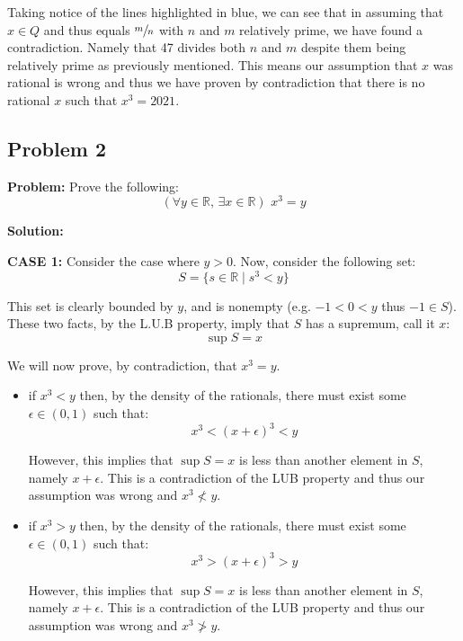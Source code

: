 \documentclass{article}
\newcommand{\R}{\mathbb R}
\begin{document}
Taking notice of the lines highlighted in blue, we can see that in assuming that $x\in Q$ and thus equals $\sfrac{m}{n}$ with $n$ and $m$ relatively prime, we have found a contradiction. Namely that 47 divides both $n$ and $m$ despite them being relatively prime as previously mentioned. This means our assumption that $x$ was rational is wrong and thus we have proven by contradiction that there is no rational $x$ such that $x^3=2021$.

\subsection*{Problem 2}
\noindent\textbf{Problem:} Prove the following:
\begin{equation*}
  (\forall y\in\R,\,\exists x\in\R)\,\,x^3=y
\end{equation*}


\noindent\textbf{Solution:}
\medskip

\textbf{CASE 1:} Consider the case where $y>0$. Now, consider the following set:
\begin{equation*}
  S=\{s\in\R\mid s^3<y\}
\end{equation*}

This set is clearly bounded by $y$, and is nonempty (e.g. $-1<0<y$ thus $-1\in S$). These two facts, by the L.U.B property, imply that $S$ has a supremum, call it $x$:
\begin{equation*}
  \sup S = x
\end{equation*}

We will now prove, by contradiction, that $x^3=y$.
\begin{itemize}
  \item if $x^3<y$ then, by the density of the rationals, there must exist some $\epsilon\in(0,1)$ such that:
  $$x^3<(x+\epsilon)^3<y$$

  However, this implies that $\sup S=x$ is less than another element in $S$, namely $x+\epsilon$. This is a contradiction of the LUB property and thus our assumption was wrong and $x^3\not<y$.
  \item if $x^3>y$ then, by the density of the rationals, there must exist some $\epsilon\in(0,1)$ such that:
  $$x^3>(x+\epsilon)^3>y$$

  However, this implies that $\sup S=x$ is less than another element in $S$, namely $x+\epsilon$. This is a contradiction of the LUB property and thus our assumption was wrong and $x^3\not>y$.
\end{itemize}
\end{document}
